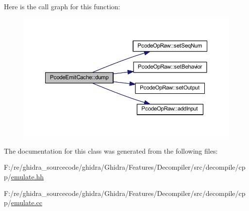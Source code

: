 Here is the call graph for this function\+:
\nopagebreak
\begin{figure}[H]
\begin{center}
\leavevmode
\includegraphics[width=350pt]{class_pcode_emit_cache_a493e849e384f3a63cbf1676c43d6bbe1_cgraph}
\end{center}
\end{figure}


The documentation for this class was generated from the following files\+:\begin{DoxyCompactItemize}
\item 
F\+:/re/ghidra\+\_\+sourcecode/ghidra/\+Ghidra/\+Features/\+Decompiler/src/decompile/cpp/\mbox{\hyperlink{emulate_8hh}{emulate.\+hh}}\item 
F\+:/re/ghidra\+\_\+sourcecode/ghidra/\+Ghidra/\+Features/\+Decompiler/src/decompile/cpp/\mbox{\hyperlink{emulate_8cc}{emulate.\+cc}}\end{DoxyCompactItemize}
